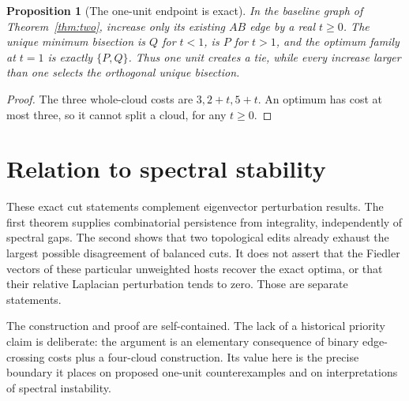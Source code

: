 \documentclass[11pt]{article}
\newtheorem{proposition}[theorem]{Proposition}
\begin{document}
\begin{proposition}[The one-unit endpoint is exact]
In the baseline graph of Theorem~\ref{thm:two}, increase only its
existing $AB$ edge by a real $t\ge0$. The unique minimum bisection is
$Q$ for $t<1$, is $P$ for $t>1$, and the optimum family at $t=1$ is
exactly $\{P,Q\}$. Thus one unit creates a tie, while every increase
larger than one selects the orthogonal unique bisection.
\end{proposition}
\begin{proof}
The three whole-cloud costs are $3,2+t,5+t$. An optimum has cost at
most three, so it cannot split a cloud, for any $t\ge0$.
\end{proof}

\section*{Relation to spectral stability}
These exact cut statements complement eigenvector perturbation results.
The first theorem supplies combinatorial persistence from integrality,
independently of spectral gaps. The second shows that two topological
edits already exhaust the largest possible disagreement of balanced
cuts. It does not assert that the Fiedler vectors of these particular
unweighted hosts recover the exact optima, or that their relative
Laplacian perturbation tends to zero. Those are separate statements.

The construction and proof are self-contained. The lack of a historical
priority claim is deliberate: the argument is an elementary consequence
of binary edge-crossing costs plus a four-cloud construction. Its value
here is the precise boundary it places on proposed one-unit
counterexamples and on interpretations of spectral instability.
\end{document}
